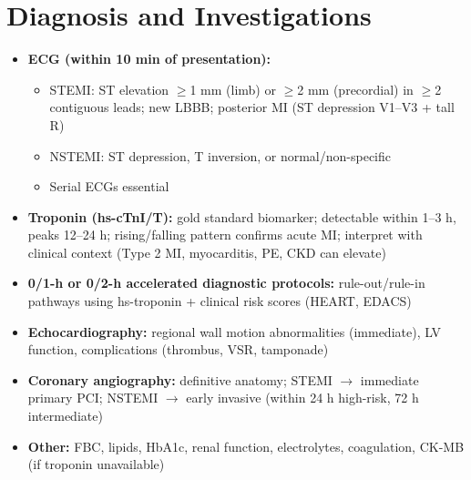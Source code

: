 \section*{Diagnosis and Investigations}
\begin{itemize}
    \item \textbf{ECG (within 10 min of presentation):}
    \begin{itemize}
        \item STEMI: ST elevation $\ge$1 mm (limb) or $\ge$2 mm (precordial) in $\ge$2 contiguous leads; new LBBB; posterior MI (ST depression V1--V3 + tall R)
        \item NSTEMI: ST depression, T inversion, or normal/non-specific
        \item Serial ECGs essential
    \end{itemize}
    \item \textbf{Troponin (hs-cTnI/T):} gold standard biomarker; detectable within 1--3 h, peaks 12--24 h; rising/falling pattern confirms acute MI; interpret with clinical context (Type 2 MI, myocarditis, PE, CKD can elevate)
    \item \textbf{0/1-h or 0/2-h accelerated diagnostic protocols:} rule-out/rule-in pathways using hs-troponin + clinical risk scores (HEART, EDACS)
    \item \textbf{Echocardiography:} regional wall motion abnormalities (immediate), LV function, complications (thrombus, VSR, tamponade)
    \item \textbf{Coronary angiography:} definitive anatomy; STEMI $\to$ immediate primary PCI; NSTEMI $\to$ early invasive (within 24 h high-risk, 72 h intermediate)
    \item \textbf{Other:} FBC, lipids, HbA1c, renal function, electrolytes, coagulation, CK-MB (if troponin unavailable)
\end{itemize}

